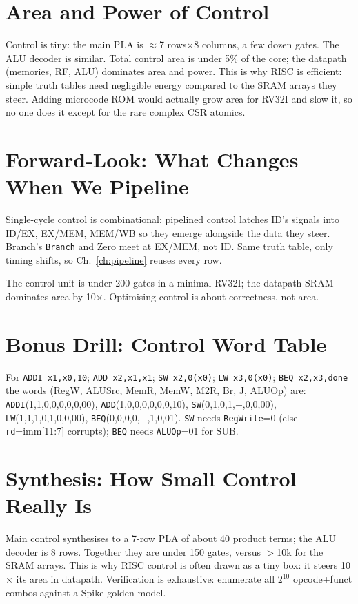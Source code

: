 \section{Area and Power of Control}
Control is tiny: the main PLA is $\approx$7 rows$\times$8 columns, a few dozen gates. The ALU decoder is similar. Total control area is under 5\% of the core; the datapath (memories, RF, ALU) dominates area and power. This is why RISC is efficient: simple truth tables need negligible energy compared to the SRAM arrays they steer. Adding microcode ROM would actually grow area for RV32I and slow it, so no one does it except for the rare complex CSR atomics.



\section{Forward-Look: What Changes When We Pipeline}
Single-cycle control is combinational; pipelined control latches ID's signals into ID/EX, EX/MEM, MEM/WB so they emerge alongside the data they steer. Branch's \texttt{Branch} and Zero meet at EX/MEM, not ID. Same truth table, only timing shifts, so Ch.~\ref{ch:pipeline} reuses every row.

The control unit is under 200 gates in a minimal RV32I; the datapath SRAM dominates area by 10$\times$. Optimising control is about correctness, not area.


\section{Bonus Drill: Control Word Table}
For \texttt{ADDI x1,x0,10}; \texttt{ADD x2,x1,x1}; \texttt{SW x2,0(x0)}; \texttt{LW x3,0(x0)}; \texttt{BEQ x2,x3,done} the words (RegW, ALUSrc, MemR, MemW, M2R, Br, J, ALUOp) are: \texttt{ADDI}(1,1,0,0,0,0,0,00), \texttt{ADD}(1,0,0,0,0,0,0,10), \texttt{SW}(0,1,0,1,$-$,0,0,00), \texttt{LW}(1,1,1,0,1,0,0,00), \texttt{BEQ}(0,0,0,0,$-$,1,0,01). \texttt{SW} needs \texttt{RegWrite}=0 (else \texttt{rd}=imm[11:7] corrupts); \texttt{BEQ} needs \texttt{ALUOp}=01 for SUB.



\section{Synthesis: How Small Control Really Is}
Main control synthesises to a 7-row PLA of about 40 product terms; the ALU decoder is 8 rows. Together they are under 150 gates, versus $>$10k for the SRAM arrays. This is why RISC control is often drawn as a tiny box: it steers 10$\times$ its area in datapath. Verification is exhaustive: enumerate all $2^{10}$ opcode+funct combos against a Spike golden model.

